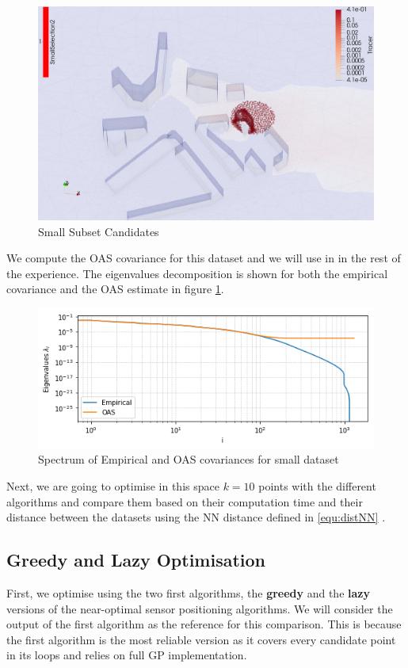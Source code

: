 \begin{figure}[h!]
\centering
    \includegraphics[width=0.8\linewidth]{figures/CompAlg/3rd/non_centered_60.35.0/candidates_screenshot}
    \caption{Small Subset Candidates}
\end{figure}

We compute the OAS covariance for this dataset and we will use in in the rest of the experience. The eigenvalues decomposition is shown for both the empirical covariance and the OAS estimate in figure \ref{fig:small_cov_eig}. \\

\begin{figure}[h!]
\centering
    \includegraphics[width=0.7\linewidth]{figures/CompAlg/covarianceEmpOAS}
    \caption{Spectrum of Empirical and OAS covariances for small dataset}
    \label{fig:small_cov_eig}
\end{figure}

Next, we are going to optimise in this space $k=10$ points with the different algorithms and compare them based on their computation time and their distance between the datasets using the NN distance defined in \ref{equ:distNN} . 

\subsection{Greedy and Lazy Optimisation}

First, we optimise using the two first algorithms, the \textbf{greedy} and the \textbf{lazy} versions of the near-optimal sensor positioning algorithms. We will consider the output of the first algorithm as the reference for this comparison. This is because the first algorithm is the most reliable version as it covers every candidate point in its loops and relies on full GP implementation.  \\


